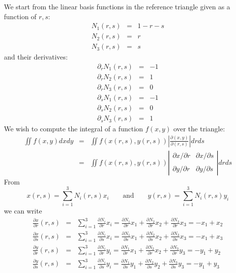 We start from the linear basis functions in the reference triangle given as a function of $r,s$:
\begin{eqnarray}
N_1(r,s) &=& 1-r-s \\
N_2(r,s) &=& r \\
N_3(r,s) &=& s
\end{eqnarray}
and their derivatives:
\begin{eqnarray}
\partial_r N_1(r,s) &=& -1 \\
\partial_r N_2(r,s) &=& 1 \\
\partial_r N_3(r,s) &=& 0 \\
\partial_s N_1(r,s) &=& -1 \\
\partial_s N_2(r,s) &=& 0\\
\partial_s N_3(r,s) &=& 1
\end{eqnarray}
We wish to compute the integral of a function $f(x,y)$ over the triangle:
\begin{eqnarray}
\iint f(x,y) dx dy 
&=& \iint f(x(r,s),y(r,s)) \left| \frac{\partial (x,y)}{\partial (r,s) } \right|  dr ds \\
&=& \iint f(x(r,s),y(r,s)) 
\left| 
\begin{array}{cc}
\partial x/\partial r & \partial x/\partial s \\ \\
\partial y/\partial r & \partial y/\partial s 
\end{array}
\right|  dr ds 
\end{eqnarray}
From 
\[
x(r,s)=\sum_{i=1}^3 N_i(r,s) x_i 
\qquad \text{and} \qquad 
y(r,s)=\sum_{i=1}^3 N_i(r,s) y_i 
\]
we can write
\begin{eqnarray}
\frac{\partial x}{\partial r}(r,s)
&=&\sum_{i=1}^3 \frac{\partial N_i}{\partial r} x_i
=\frac{\partial N_1}{\partial r} x_1+\frac{\partial N_2}{\partial r} x_2+\frac{\partial N_3}{\partial r} x_3
=- x_1+ x_2 \nonumber\\
\frac{\partial x}{\partial s}(r,s)
&=&\sum_{i=1}^3 \frac{\partial N_i}{\partial s} x_i
=\frac{\partial N_1}{\partial s} x_1+\frac{\partial N_2}{\partial s} x_2+\frac{\partial N_3}{\partial s} x_3
=- x_1+ x_3
\nonumber\\
\frac{\partial y}{\partial r}(r,s)
&=&\sum_{i=1}^3 \frac{\partial N_i}{\partial r} y_i
=\frac{\partial N_1}{\partial r} x_1+\frac{\partial N_2}{\partial r} x_2+\frac{\partial N_3}{\partial r} y_3
=- y_1+ y_2
\nonumber\\
\frac{\partial y}{\partial s}(r,s)
&=&\sum_{i=1}^3 \frac{\partial N_i}{\partial s} y_i
=\frac{\partial N_1}{\partial s} y_1+\frac{\partial N_2}{\partial s} y_2+\frac{\partial N_3}{\partial s} y_3
=- y_1+ y_3
\end{eqnarray}
